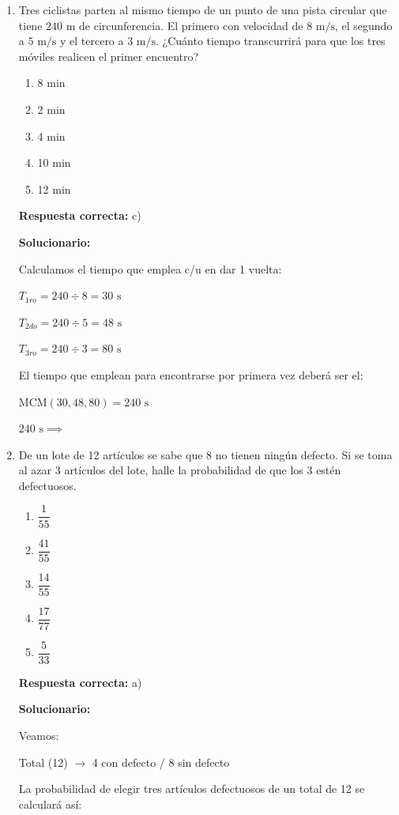 \begin{enumerate}
	\item Tres ciclistas parten al mismo tiempo de un punto de una pista circular que tiene $240\text{ m}$ de circunferencia. El primero con velocidad de $8\text{ m/s}$, el segundo a $5\text{ m/s}$ y el tercero a $3\text{ m/s}$. ¿Cuánto tiempo transcurrirá para que los tres móviles realicen el primer encuentro?
	\begin{enumerate}[label=\alph*)]
		\item 8 min
		\item 2 min
		\item 4 min
		\item 10 min
		\item 12 min
	\end{enumerate}
	\textbf{Respuesta correcta:} c)

	\vspace{2mm}
	\textbf{Solucionario:}

	Calculamos el tiempo que emplea c/u en dar 1 vuelta:

	$T_{1ro} = 240 \div 8 = 30\text{ s}$

	$T_{2do} = 240 \div 5 = 48\text{ s}$

	$T_{3ro} = 240 \div 3 = 80\text{ s}$

	El tiempo que emplean para encontrarse por primera vez deberá ser el:

	$\text{MCM}(30, 48, 80) = 240\text{ s}$

	$240\text{ s} \implies $

	\vspace{6mm}

	\item De un lote de 12 artículos se sabe que 8 no tienen ningún defecto. Si se toma al azar 3 artículos del lote, halle la probabilidad de que los 3 estén defectuosos.
	\begin{enumerate}[label=\alph*)]
		\item $\dfrac{1}{55}$
		\item $\dfrac{41}{55}$
		\item $\dfrac{14}{55}$
		\item $\dfrac{17}{77}$
		\item $\dfrac{5}{33}$
	\end{enumerate}
	\textbf{Respuesta correcta:} a)

	\vspace{2mm}
	\textbf{Solucionario:}

	Veamos:
	\begin{center}
		Total (12) $\rightarrow$ 4 con defecto / 8 sin defecto
	\end{center}
	La probabilidad de elegir tres artículos defectuosos de un total de 12 se calculará así:



\end{enumerate}
